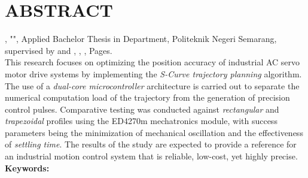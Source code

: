 \chapter*{ABSTRACT}
\noindent {\penulis}, "{\judulen}", Applied Bachelor Thesis in {\jurusan} Department, Politeknik Negeri Semarang, supervised by {\pembimbingsatu} and {\pembimbingdua}, {\bulan}, {\tahun}, \pageref{LastPage} Pages.
\\[0.6cm]

This research focuses on optimizing the position accuracy of industrial AC servo
motor drive systems by implementing the \textit{S-Curve trajectory planning}
algorithm. The use of a \textit{dual-core microcontroller} architecture is
carried out to separate the numerical computation load of the trajectory from
the generation of precision control pulses. Comparative testing was conducted
against \textit{rectangular} and \textit{trapezoidal} profiles using the ED4270m
mechatronics module, with success parameters being the minimization of
mechanical oscillation and the effectiveness of \textit{settling time}. The
results of the study are expected to provide a reference for an industrial
motion control system that is reliable, low-cost, yet highly precise. \\[0.6cm]

\noindent \textbf{Keywords:} \keyword